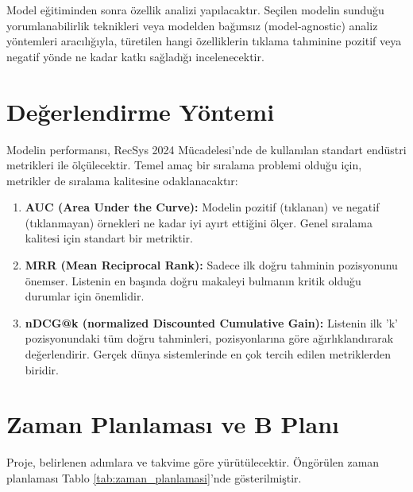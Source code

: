 \documentclass[conference]{IEEEtran}
\begin{document}
Model eğitiminden sonra özellik analizi yapılacaktır. Seçilen modelin sunduğu yorumlanabilirlik teknikleri veya modelden bağımsız (model-agnostic) analiz yöntemleri aracılığıyla, türetilen hangi özelliklerin tıklama tahminine pozitif veya negatif yönde ne kadar katkı sağladığı incelenecektir.










\section{Değerlendirme Yöntemi}
\label{sec:evaluation}

Modelin performansı, RecSys 2024 Mücadelesi'nde de kullanılan standart endüstri metrikleri ile ölçülecektir. Temel amaç bir sıralama problemi olduğu için, metrikler de sıralama kalitesine odaklanacaktır:

\begin{enumerate}
    \item \textbf{AUC (Area Under the Curve):} Modelin pozitif (tıklanan) ve negatif (tıklanmayan) örnekleri ne kadar iyi ayırt ettiğini ölçer. Genel sıralama kalitesi için standart bir metriktir.
    \item \textbf{MRR (Mean Reciprocal Rank):} Sadece ilk doğru tahminin pozisyonunu önemser. Listenin en başında doğru makaleyi bulmanın kritik olduğu durumlar için önemlidir.
    \item \textbf{nDCG@k (normalized Discounted Cumulative Gain):} Listenin ilk 'k' pozisyonundaki tüm doğru tahminleri, pozisyonlarına göre ağırlıklandırarak değerlendirir. Gerçek dünya sistemlerinde en çok tercih edilen metriklerden biridir.
\end{enumerate}

\section{Zaman Planlaması ve B Planı}
\label{sec:plan}

Proje, belirlenen adımlara ve takvime göre yürütülecektir. Öngörülen zaman planlaması Tablo \ref{tab:zaman_planlamasi}'nde gösterilmiştir.
\end{document}
